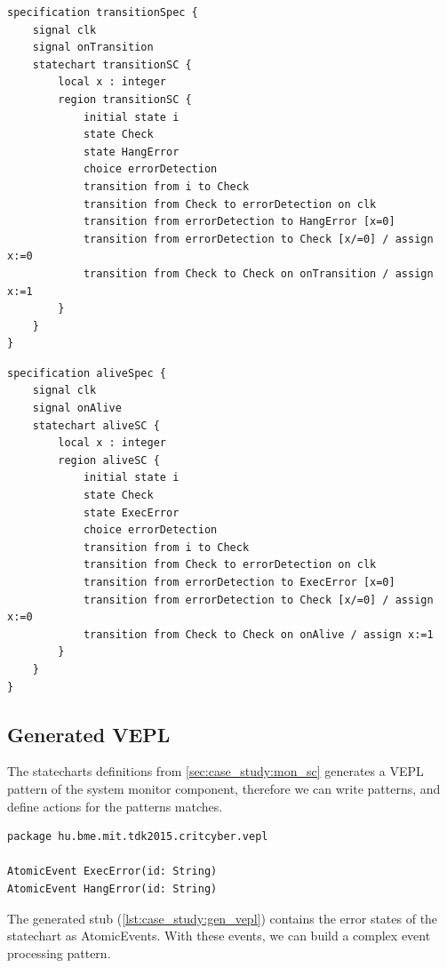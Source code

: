 \newpage
\begin{lstlisting}[caption={Statechart representation of hang error detection},label=lst:case_study:hang_error]
specification transitionSpec {
    signal clk
    signal onTransition
    statechart transitionSC {
        local x : integer
        region transitionSC {
            initial state i
            state Check
            state HangError
            choice errorDetection
            transition from i to Check
            transition from Check to errorDetection on clk
            transition from errorDetection to HangError [x=0]
            transition from errorDetection to Check [x/=0] / assign x:=0
            transition from Check to Check on onTransition / assign x:=1
        }
    }
}
\end{lstlisting}

\begin{lstlisting}[caption={Statechart representation of hang error detection},label=lst:case_study:hang_error]
specification aliveSpec {
    signal clk
    signal onAlive
    statechart aliveSC {
        local x : integer
        region aliveSC {
            initial state i
            state Check
            state ExecError
            choice errorDetection
            transition from i to Check
            transition from Check to errorDetection on clk
            transition from errorDetection to ExecError [x=0]
            transition from errorDetection to Check [x/=0] / assign x:=0
            transition from Check to Check on onAlive / assign x:=1
        }
    }
}
\end{lstlisting}

\newpage
\subsection{Generated VEPL}

The statecharts definitions from \cref{sec:case_study:mon_sc} generates a VEPL pattern of the system monitor component, therefore we can write patterns, and define actions for the patterns matches.

\begin{lstlisting}[caption={Generated VEPL definition},label=lst:case_study:gen_vepl]
package hu.bme.mit.tdk2015.critcyber.vepl

AtomicEvent ExecError(id: String)
AtomicEvent HangError(id: String)
\end{lstlisting}

\nohyphenation The generated stub (\cref{lst:case_study:gen_vepl}) contains the error states of the statechart as AtomicEvents. With these events, we can build a complex event processing pattern.
\\[1ex]

